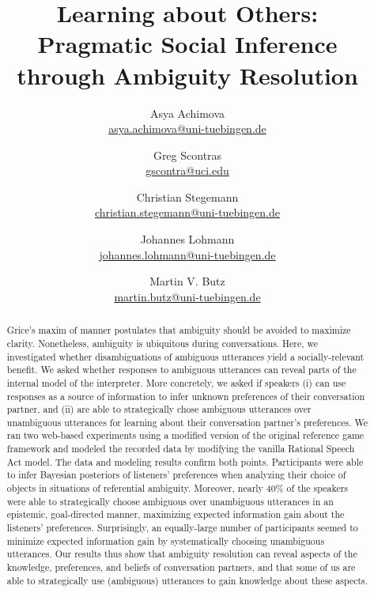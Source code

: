 \documentclass[10pt,a4paper]{article}
\title{Learning about Others:\\
	Pragmatic Social Inference \\ through Ambiguity Resolution
}
\author{
		Asya Achimova\\
		\href{mailto:asya.achimova@uni-tuebingen.de}{asya.achimova@uni-tuebingen.de}
	\and
		Greg Scontras\\
		\href{mailto:gscontra@uci.edu}{gscontra@uci.edu}
	\and 
		Christian Stegemann\\
		\href{mailto:christian.stegemann@uni-tuebingen.de}{christian.stegemann@uni-tuebingen.de}
	\and
		Johannes Lohmann\\
		\href{mailto:johannes.lohmann@uni-tuebingen.de}{johannes.lohmann@uni-tuebingen.de}
	\and
		Martin V. Butz \\
		\href{mailto:martin.butz@uni-tuebingen.de}{martin.butz@uni-tuebingen.de}
	}
\begin{document}
\maketitle

\begin{abstract}
Grice's maxim of manner postulates that ambiguity should be avoided to maximize clarity.
Nonetheless, ambiguity is ubiquitous during conversations.
Here, we investigated whether disambiguations of ambiguous utterances yield a socially-relevant benefit.
We asked whether responses to ambiguous utterances can reveal parts of the internal model of the interpreter. 
More concretely, we asked if speakers (i) can use responses as a source of information to infer unknown preferences of their conversation partner, and (ii) are able to strategically chose ambiguous utterances over unambiguous utterances for learning about their conversation partner's preferences. 
We ran two web-based experiments using a modified version of the original reference game framework \cite{frankgoodman2012} and modeled the recorded data by modifying the vanilla Rational Speech Act model.
The data and modeling results confirm both points. 
Participants were able to infer Bayesian posteriors of listeners' preferences when analyzing their choice of objects in situations of referential ambiguity.
Moreover, nearly 40\% of the speakers were able to strategically choose ambiguous over unambiguous utterances in an epistemic, goal-directed manner, maximizing expected information gain about the listeners' preferences.
Surprisingly, an equally-large number of participants seemed to minimize expected information gain by systematically choosing unambiguous utterances. 
Our results thus show that ambiguity resolution can reveal aspects of the knowledge, preferences, and beliefs of conversation partners, and that some of us are able to strategically use (ambiguous) utterances to gain knowledge about these aspects.

\end{abstract}
\end{document}
